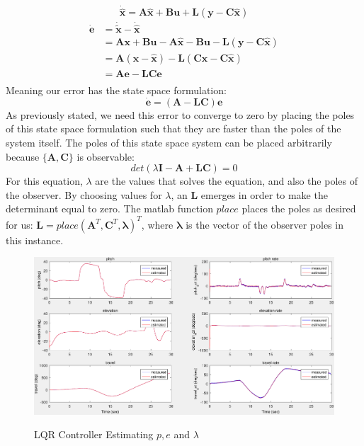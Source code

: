 \begin{equation*}
  \dot{\hat{\bm{x}}} = \bm{A}\hat{\bm{x}}+\bm{B}\bm{u} + \bm{L}(\bm{y}
  - \bm{C}\hat{\bm{x}})
\end{equation*}
\begin{align*}
  \dot{\bm{e}} &= \dot{\bm{\tilde{x}}} - \dot{\hat{\bm{x}}} \\
							 &= \bm{Ax} + \bm{Bu} - \bm{A}\hat{\bm{x}} - \bm{Bu} - \bm{L}(\bm{y}- \bm{C}\hat{\bm{x}}) \\
							 &= \bm{A}(\bm{x} - \hat{\bm{x}}) - \bm{L}(\bm{C}\bm{x}- \bm{C}\hat{\bm{x}}) \\
							 &= \bm{Ae} - \bm{LCe} \\
\end{align*}
Meaning our error has the state space formulation:
\begin{equation}
	\dot{\bm{e}} = (\bm{A} - \bm{LC})\bm{e}
\end{equation}
As previously stated, we need this error to converge to zero by placing the poles of this state space formulation such that they are faster than the poles of the system itself. The poles of this state space system can be placed arbitrarily because $\{\bm{A},\bm{C}\}$ is observable:
\begin{equation*}
det(\lambda\bm{I} - \bm{A} +\bm{LC}) = 0
\end{equation*}
For this equation, $\lambda$ are the values that solves the equation, and also the poles of the observer. By choosing values for $\lambda$, an $\bm{L}$ emerges in order to make the determinant equal to zero. The matlab function $place$ places the poles as desired for us: $\bm{L} = place(\bm{A}^T,\bm{C}^T,\bm{\lambda})^T$, where $\bm{\lambda}$ is the vector of the observer poles in this instance.

\begin{figure}[H]
\caption{LQR Controller Estimating $p, e$ and $\lambda$}
	\centering
		\includegraphics[scale =0.4]{images/542_LQR_Estimator.pdf}
	\label{fig:LQR_Estimator}
\end{figure}

